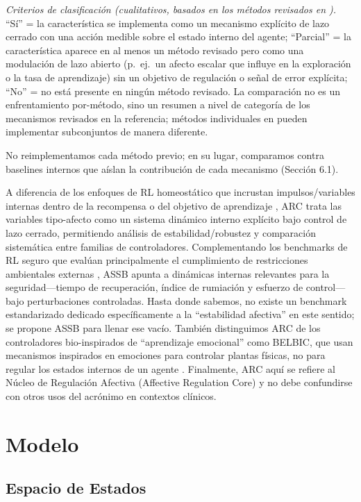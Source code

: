 \documentclass{article}
\begin{document}
\textit{Criterios de clasificación (cualitativos, basados en los métodos revisados en \cite{Moerland2018}).} ``Sí'' = la característica se implementa como un mecanismo explícito de lazo cerrado con una acción medible sobre el estado interno del agente; ``Parcial'' = la característica aparece en al menos un método revisado pero como una modulación de lazo abierto (p.\ ej.\ un afecto escalar que influye en la exploración o la tasa de aprendizaje) sin un objetivo de regulación o señal de error explícita; ``No'' = no está presente en ningún método revisado. La comparación no es un enfrentamiento por-método, sino un resumen a nivel de categoría de los mecanismos revisados en la referencia; métodos individuales en \cite{Moerland2018} pueden implementar subconjuntos de manera diferente.

No reimplementamos cada método previo; en su lugar, comparamos contra baselines internos que aíslan la contribución de cada mecanismo (Sección 6.1).

A diferencia de los enfoques de RL homeostático que incrustan impulsos/variables internas dentro de la recompensa o del objetivo de aprendizaje \cite{Keramati2014}, ARC trata las variables tipo-afecto como un sistema dinámico interno explícito bajo control de lazo cerrado, permitiendo análisis de estabilidad/robustez y comparación sistemática entre familias de controladores. Complementando los benchmarks de RL seguro que evalúan principalmente el cumplimiento de restricciones ambientales externas \cite{Leike2017, Ray2019, Ji2023}, ASSB apunta a dinámicas internas relevantes para la seguridad---tiempo de recuperación, índice de rumiación y esfuerzo de control---bajo perturbaciones controladas. Hasta donde sabemos, no existe un benchmark estandarizado dedicado específicamente a la ``estabilidad afectiva'' en este sentido; se propone ASSB para llenar ese vacío. También distinguimos ARC de los controladores bio-inspirados de ``aprendizaje emocional'' como BELBIC, que usan mecanismos inspirados en emociones para controlar plantas físicas, no para regular los estados internos de un agente \cite{Lucas2004}. Finalmente, ARC aquí se refiere al Núcleo de Regulación Afectiva (Affective Regulation Core) y no debe confundirse con otros usos del acrónimo en contextos clínicos.

\section{Modelo}

\subsection{Espacio de Estados}
\end{document}
